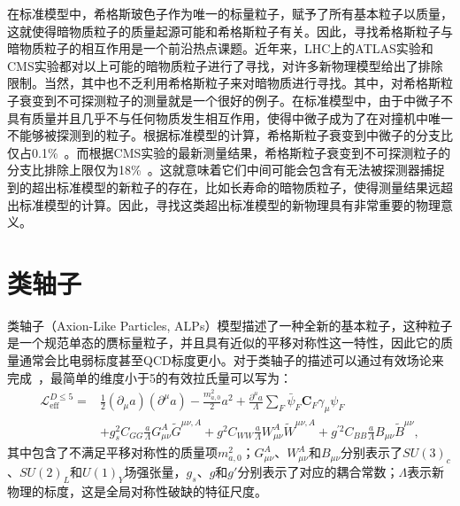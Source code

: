 在标准模型中，希格斯玻色子作为唯一的标量粒子，赋予了所有基本粒子以质量，这就使得暗物质粒子的质量起源可能和希格斯粒子有关。因此，寻找希格斯粒子与暗物质粒子的相互作用是一个前沿热点课题。近年来，LHC上的ATLAS实验和CMS实验都对以上可能的暗物质粒子进行了寻找，对许多新物理模型给出了排除限制。当然，其中也不乏利用希格斯粒子来对暗物质进行寻找。其中，对希格斯粒子衰变到不可探测粒子的测量就是一个很好的例子。在标准模型中，由于中微子不具有质量并且几乎不与任何物质发生相互作用，使得中微子成为了在对撞机中唯一不能够被探测到的粒子。根据标准模型的计算，希格斯粒子衰变到中微子的分支比仅占0.1\%~\cite{Dittmaier:2011ti}。而根据CMS实验的最新测量结果，希格斯粒子衰变到不可探测粒子的分支比排除上限仅为18\%~\cite{Hinv}。这就意味着它们中间可能会包含有无法被探测器捕捉到的超出标准模型的新粒子的存在，比如长寿命的暗物质粒子，使得测量结果远超出标准模型的计算。因此，寻找这类超出标准模型的新物理具有非常重要的物理意义。

\section{类轴子}
\label{sec:first}
类轴子（Axion-Like Particles, ALPs）模型描述了一种全新的基本粒子，这种粒子是一个规范单态的赝标量粒子，并且具有近似的平移对称性这一特性，因此它的质量通常会比电弱标度甚至QCD标度更小。对于类轴子的描述可以通过有效场论来完成~\cite{PhysRevLett.119.031802,Bauer:2017ris}，最简单的维度小于5的有效拉氏量可以写为：
\begin{equation}\label{eq:1-12}
    \begin{aligned}
    \mathcal{L}_{\text {eff }}^{D \leq 5}= & \frac{1}{2}(\partial_{\mu} a)\left(\partial^{\mu} a\right)-\frac{m_{a, 0}^{2}}{2} a^{2}+\frac{\partial^{\mu} a}{\Lambda} \sum_{F} \bar{\psi}_{F} \boldsymbol{C}_{F} \gamma_{\mu} \psi_{F} \\
    & +g_{s}^{2} C_{G G} \frac{a}{\Lambda} G_{\mu \nu}^{A} \tilde{G}^{\mu \nu, A}+g^{2} C_{W W} \frac{a}{\Lambda} W_{\mu \nu}^{A} \tilde{W}^{\mu \nu, A}+g^{\prime 2} C_{B B} \frac{a}{\Lambda} B_{\mu \nu} \tilde{B}^{\mu \nu},
    \end{aligned}
\end{equation}
其中包含了不满足平移对称性的质量项$m_{a, 0}^{2}$；$G_{\mu \nu}^{A}$、$W_{\mu \nu}^{A}$和$B_{\mu \nu}$分别表示了$SU(3)_c$、$SU(2)_L$和$U(1)_Y$场强张量，$g_s$、$g$和$g'$分别表示了对应的耦合常数；$\Lambda$表示新物理的标度，这是全局对称性破缺的特征尺度。

